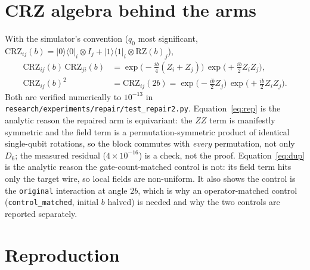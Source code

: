 \documentclass{neurips_2024}
\begin{document}
\appendix

\section{CRZ algebra behind the arms}
\label{app:crz}

With the simulator's convention ($q_0$ most significant,
$\mathrm{CRZ}_{ij}(b)=\lvert0\rangle\langle0\rvert_i\otimes I_j +
\lvert1\rangle\langle1\rvert_i\otimes\mathrm{RZ}(b)_j$),
\begin{align}
 \mathrm{CRZ}_{ij}(b)\,\mathrm{CRZ}_{ji}(b)
   &= \exp\!\bigl(-\tfrac{i b}{4}(Z_i+Z_j)\bigr)\,
      \exp\!\bigl(+\tfrac{i b}{2}Z_iZ_j\bigr), \label{eq:rep}\\
 \mathrm{CRZ}_{ij}(b)^2 &= \mathrm{CRZ}_{ij}(2b)
   = \exp\!\bigl(-\tfrac{i b}{2}Z_j\bigr)\,
     \exp\!\bigl(+\tfrac{i b}{2}Z_iZ_j\bigr). \label{eq:dup}
\end{align}
Both are verified numerically to $10^{-13}$ in
\texttt{research/experiments/repair/test\_repair2.py}. Equation~\eqref{eq:rep} is the
analytic reason the repaired arm is equivariant: the $ZZ$ term is manifestly symmetric and
the field term is a permutation-symmetric product of identical single-qubit rotations, so
the block commutes with \emph{every} permutation, not only $D_6$; the measured residual
($4\times10^{-16}$) is a check, not the proof. Equation~\eqref{eq:dup} is the analytic
reason the gate-count-matched control is not: its field term hits only the target wire, so
local fields are non-uniform. It also shows the control is the \texttt{original}
interaction at angle $2b$, which is why an operator-matched control
(\texttt{control\_matched}, initial $b$ halved) is needed and why the two controls are
reported separately.

\section{Reproduction}
\label{app:repro}
\end{document}
